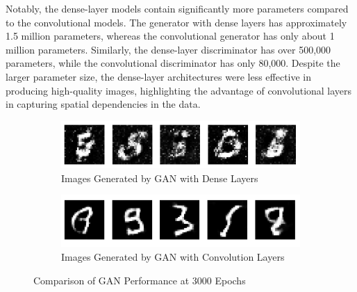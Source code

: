 Notably, the dense-layer models contain significantly more parameters compared to the convolutional models. The generator with dense layers has approximately 1.5 million parameters, whereas the convolutional generator has only about 1 million parameters. Similarly, the dense-layer discriminator has over 500,000 parameters, while the convolutional discriminator has only 80,000. Despite the larger parameter size, the dense-layer architectures were less effective in producing high-quality images, highlighting the advantage of convolutional layers in capturing spatial dependencies in the data.


\begin{figure}[H]
    \centering
    \begin{subfigure}[b]{\linewidth}
        \centering
        \includegraphics[width=0.7\linewidth]{./Images/generate_image_by_dense_layer.jpg}
        \caption{Images Generated by GAN with Dense Layers}
        \label{fig:generated_dense}
    \end{subfigure}
    \vspace{0.05\linewidth} 
    \begin{subfigure}[b]{\linewidth}
        \centering
        \includegraphics[width=0.7\linewidth]{./Images/generate_image_by_Convolution_layer.jpg}
        \caption{Images Generated by GAN with Convolution Layers}
        \label{fig:generated_conv}
    \end{subfigure}
    \caption{Comparison of GAN Performance at 3000 Epochs}
    \label{fig:generated_images}
\end{figure}

